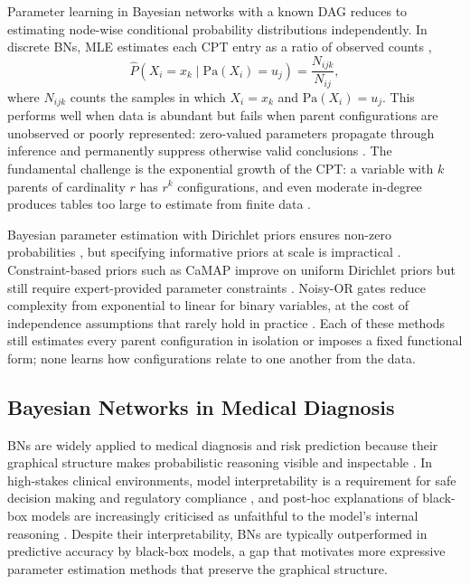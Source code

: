 \documentclass[a4paper,fleqn]{cas-dc}
\newcommand{\Pa}{\mathrm{Pa}}
\begin{document}
Parameter learning in Bayesian networks with a known DAG reduces to estimating node-wise conditional probability distributions independently. In discrete BNs, MLE estimates each CPT entry as a ratio of observed counts \citep{koller2009probabilistic},
\begin{equation}
\hat{P}(X_i = x_k \mid \Pa(X_i)=u_j)=\frac{N_{ijk}}{N_{ij}},
\label{eq:mle}
\end{equation}
where $N_{ijk}$ counts the samples in which $X_i=x_k$ and $\Pa(X_i)=u_j$. This performs well when data is abundant but fails when parent configurations are unobserved or poorly represented: zero-valued parameters propagate through inference and permanently suppress otherwise valid conclusions \citep{impact_oniko_2013}. The fundamental challenge is the exponential growth of the CPT: a variable with $k$ parents of cardinality $r$ has $r^k$ configurations, and even moderate in-degree produces tables too large to estimate from finite data \citep{learning_oniko_2001,koller2009probabilistic}.

Bayesian parameter estimation with Dirichlet priors ensures non-zero probabilities \citep{koller2009probabilistic}, but specifying informative priors at scale is impractical \citep{comprehensive_kyrimi_2021}. Constraint-based priors such as CaMAP improve on uniform Dirichlet priors but still require expert-provided parameter constraints \citep{constrained_di_2021}. Noisy-OR gates reduce complexity from exponential to linear for binary variables, at the cost of independence assumptions that rarely hold in practice \citep{learning_oniko_2001}. Each of these methods still estimates every parent configuration in isolation or imposes a fixed functional form; none learns how configurations relate to one another from the data.

\subsection{Bayesian Networks in Medical Diagnosis}

BNs are widely applied to medical diagnosis and risk prediction because their graphical structure makes probabilistic reasoning visible and inspectable \citep{comprehensive_kyrimi_2021,zhong2024predicting,bayesian_polotskaya_2024}. In high-stakes clinical environments, model interpretability is a requirement for safe decision making and regulatory compliance \citep{explainable_hulsen_2023}, and post-hoc explanations of black-box models are increasingly criticised as unfaithful to the model's internal reasoning \citep{stop_rudin_2019}. Despite their interpretability, BNs are typically outperformed in predictive accuracy by black-box models, a gap that motivates more expressive parameter estimation methods that preserve the graphical structure.
\end{document}
